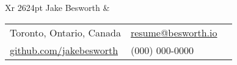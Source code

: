 \documentclass[11pt]{extarticle}
\makeatletter
\newcommand\NAMESIZE{\@setfontsize\Huge{26}{24pt}}
\makeatother
\begin{document}
{
    \begin{tabularx}{\textwidth}{Xr}
    {\NAMESIZE\leavevmode\color{color-title} Jake Besworth} &
        \null\hfill\small\begin{tabular}{llX}
            \faMapMarker\space\space\space\color{color-paragraph-grey} Toronto, Ontario, Canada & \faEnvelope\space\space\color{color-paragraph-grey} \href{mailto:resume@besworth.io}{resume@besworth.io} \\[3px]
            \faGithub\space\space\color{color-paragraph-grey} \href{https://github.com/jakebesworth}{github.com/jakebesworth} & {\large\faMobilePhone}\space\space\space\color{color-paragraph-grey} (000) 000-0000 \\[10px]
        \end{tabular}
    \end{tabularx}

}
\end{document}
